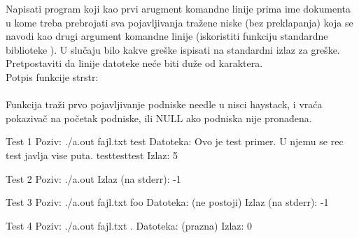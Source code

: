 \begin{Exercise}[label=904]

 Napisati program koji kao prvi arugment komandne linije prima ime dokumenta u kome treba prebrojati sva pojavljivanja tražene niske (bez preklapanja) koja se navodi kao drugi argument komandne linije (iskoristiti funkciju standardne biblioteke ). U slučaju
  bilo kakve greške ispisati  na standardni izlaz za greške.
  Pretpostaviti da linije datoteke neće biti duže od 
  karaktera.\\
  Potpis funkcije strstr:\\
  \\
  Funkcija traži prvo pojavljivanje podniske needle u nisci
  haystack, i vraća pokazivač na početak podniske, ili
  NULL ako podniska nije pronađena.

\begin{miditest}
\begin{test}{Test 1}
Poziv:  ./a.out fajl.txt test          
Datoteka:   Ovo je test primer.     
        U njemu se rec test javlja
        vise puta. testtesttest
Izlaz:  5                       
\end{test}
\end{miditest}
\begin{miditest}
\begin{test}{Test 2}
Poziv:   ./a.out      
Izlaz  (na stderr):  -1       
\end{test}
\end{miditest}


\begin{miditest}
\begin{test}{Test 3}
Poziv:   ./a.out fajl.txt foo
Datoteka:   (ne postoji)      
Izlaz (na stderr):    -1              
\end{test}
\end{miditest}
\begin{miditest}
\begin{test}{Test 4}
Poziv:  ./a.out fajl.txt .    
Datoteka:   (prazna)      
Izlaz:    0              
\end{test}
\end{miditest}
\end{Exercise}
\begin{Answer}[ref=904]
\end{Answer}


